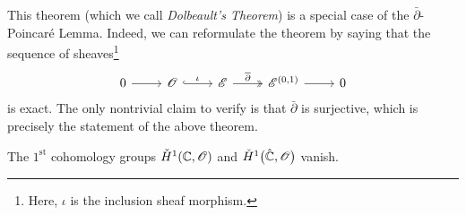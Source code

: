 \documentclass[../Moduli_Spaces_of_Riemann_Surfaces.tex]{subfiles}
\begin{document}
    \begin{remark}
        This theorem (which we call \textit{Dolbeault's Theorem}) is a special case of the $\bar{\partial}$-Poincaré Lemma. Indeed, we can reformulate the theorem by saying that the sequence of sheaves\footnote{Here, $\iota$ is the inclusion sheaf morphism.}
        \begin{equation*}
            \begin{tikzcd}
                0 \ar[r] & \HOLO \ar[r, "\iota", hookrightarrow] & \DIFF \ar[r, "\bar{\partial}", twoheadrightarrow] & \DIFF^{\l(0,1\r)} \ar[r] & 0
            \end{tikzcd}
        \end{equation*}
        is exact. The only nontrivial claim to verify is that $\bar{\partial}$ is surjective, which is precisely the statement of the above theorem.\exqed
    \end{remark}
    \begin{corollary}\label{CC:cor:vanishing_of_H_Riemann_sphere}
        The $1^\textrm{st}$ cohomology groups $\check{H}^1\!\left(\mathbb{C},\mathscr{O}\right)$ and $\check{H}^1\big(\hat{\mathbb{C}},\mathscr{O}\big)$ vanish.
    \end{corollary}
\end{document}
